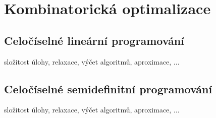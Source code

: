 \chapter{Kombinatorická optimalizace}

\section{Celočíselné lineární programování}

složitost úlohy, relaxace, výčet algoritmů, aproximace, ...

\section{Celočíselné semidefinitní programování}

složitost úlohy, relaxace, výčet algoritmů, aproximace, ...